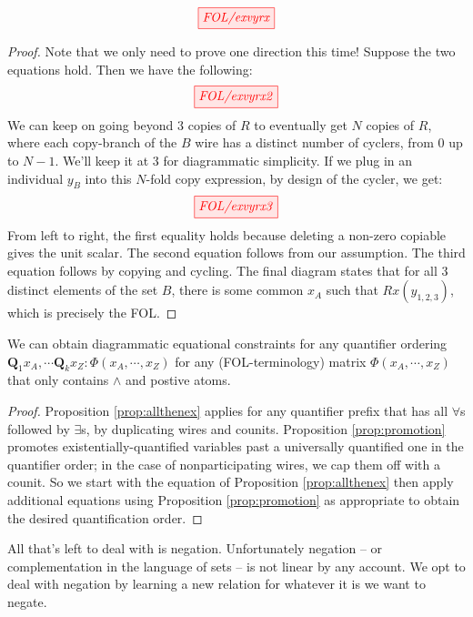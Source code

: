 \begin{fullwidth}
\begin{proposition}\label{prop:promotion}
\[\tikzfig{FOL/exvyrx}\]
\begin{proof}
Note that we only need to prove one direction this time! Suppose the two equations hold. Then we have the following:
\[\tikzfig{FOL/exvyrx2}\]
We can keep on going beyond 3 copies of $R$ to eventually get $N$ copies of $R$, where each copy-branch of the $B$ wire has a distinct number of cyclers, from 0 up to $N-1$. We'll keep it at 3 for diagrammatic simplicity. If we plug in an individual $y_B$ into this $N$-fold copy expression, by design of the cycler, we get:
\[\tikzfig{FOL/exvyrx3}\]
From left to right, the first equality holds because deleting a non-zero copiable gives the unit scalar. The second equation follows from our assumption. The third equation follows by copying and cycling. The final diagram states that for all 3 distinct elements of the set $B$, there is some common $x_A$ such that $Rx(y_{1,2,3})$, which is precisely the FOL.
\end{proof}
\end{proposition}

\begin{proposition}
We can obtain diagrammatic equational constraints for any quantifier ordering $\mathbf{Q}_1 x_A, \cdots \mathbf{Q}_k x_Z : \Phi(x_A,\cdots,x_Z)$ for any (FOL-terminology) matrix $\Phi(x_A,\cdots,x_Z)$ that only contains $\wedge$ and postive atoms.
\begin{proof}
Proposition \ref{prop:allthenex} applies for any quantifier prefix that has all $\forall$s followed by $\exists$s, by duplicating wires and counits. Proposition \ref{prop:promotion} promotes existentially-quantified variables past a universally quantified one in the quantifier order; in the case of nonparticipating wires, we cap them off with a counit. So we start with the equation of Proposition \ref{prop:allthenex} then apply additional equations using Proposition \ref{prop:promotion} as appropriate to obtain the desired quantification order.
\end{proof}
\end{proposition}

All that's left to deal with is negation. Unfortunately negation -- or complementation in the language of sets -- is not linear by any account. We opt to deal with negation by learning a new relation for whatever it is we want to negate.


\end{fullwidth}

